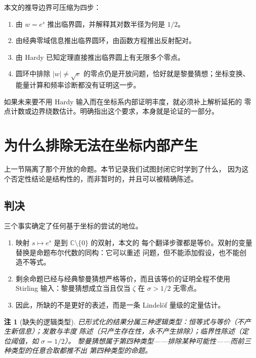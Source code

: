 \documentclass[submission,noinfoline]{jsfds}
\newtheorem*{remark}{注}
\newcommand{\Lean}[1]{}
\begin{document}
本文的推导边界可压缩为四步：

\begin{enumerate}
\item 由 $w=e^s$ 推出临界圆，并解释其对数半径为何是 $1/2$。
\item 由经典零域信息推出临界圆环，由函数方程推出反射配对。
\item 由 Hardy 已知定理直接推出临界圆上有无限多个零点。
\item 圆环中排除 $|w|\neq\sqrt e$ 的零点仍是开放问题，恰好就是黎曼猜想；坐标变换、
能量计算和频率诊断都没有证明这一步。
\end{enumerate}

如果未来要不用 Hardy 输入而在坐标系内部证明丰度，就必须补上解析延拓的
零点计数或边界绕数估计。明确指出这个要求，本身就是论证的一部分。

\section{为什么排除无法在坐标内部产生}\label{sec:negative}

上一节隔离了那个开放的命题。本节记录我们试图封闭它时学到了什么，
因为这个否定性结论是结构性的，而非暂时的，并且可以被精确陈述。

\subsection{判决}

三个事实确定了任何基于坐标的尝试的地位。

\begin{enumerate}
\item 映射 $s\mapsto e^{s}$ 是到 $\mathbb C\setminus\{0\}$ 的双射，本文的
每个翻译步骤都是等价。双射的变量替换是命题布尔代数的同构：它可以重述
问题，但不能添加假设，也不能创造不等式。\Lean{zetaCoverIsomorphism}
\item 剩余命题已经与经典黎曼猜想严格等价，而且该等价的证明全程不使用
Stirling 输入：黎曼猜想成立当且仅当 $\zeta$ 在 $\sigma>1/2$ 无零点。
\Lean{riemannHypothesis_iff_zeroFreeHalfPlane}
\item 因此，所缺的不是更好的表述，而是一条 Lindel\"of 量级的定量估计。
\end{enumerate}

\begin{remark}[缺失的逻辑类型]\label{rem:type}
已形式化的结果分属三种逻辑类型：恒等式与等价（不产生新信息）；发散与丰度
陈述（只产生存在性，永不产生排除）；临界性陈述（定位阈值，如 $\sigma=1/2$）。
黎曼猜想属于第四种类型——排除某种可能性——而前三种类型的任意合取都推不出
第四种类型的命题。
\end{remark}
\end{document}
